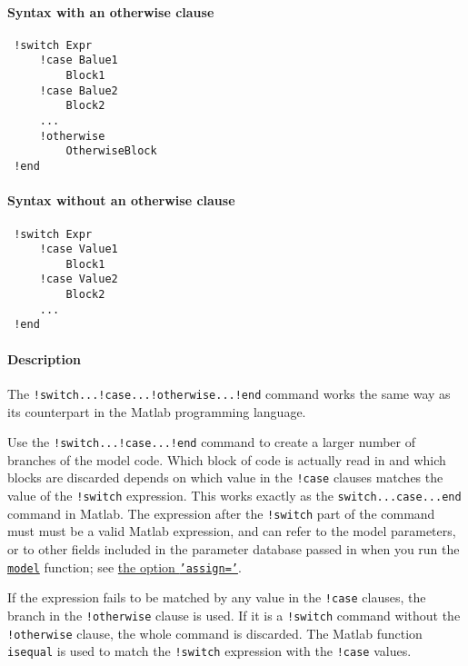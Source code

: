


	\paragraph{Syntax with an otherwise clause}
 
 \begin{verbatim}
 !switch Expr
     !case Balue1
         Block1
     !case Balue2
         Block2
     ...
     !otherwise
         OtherwiseBlock
 !end
 \end{verbatim}
 
 \paragraph{Syntax without an otherwise clause}
 
 \begin{verbatim}
 !switch Expr
     !case Value1
         Block1
     !case Value2
         Block2
     ...
 !end
 \end{verbatim}
 
 \paragraph{Description}
 
 The \texttt{!switch...!case...!otherwise...!end} command works the same
 way as its counterpart in the Matlab programming language.
 
 Use the \texttt{!switch...!case...!end} command to create a larger
 number of branches of the model code. Which block of code is actually
 read in and which blocks are discarded depends on which value in the
 \texttt{!case} clauses matches the value of the \texttt{!switch}
 expression. This works exactly as the \texttt{switch...case...end}
 command in Matlab. The expression after the \texttt{!switch} part of the
 command must must be a valid Matlab expression, and can refer to the
 model parameters, or to other fields included in the parameter database
 passed in when you run the \href{model/model}{\texttt{model}} function;
 see \href{model/model}{the option \texttt{'assign='}}.
 
 If the expression fails to be matched by any value in the \texttt{!case}
 clauses, the branch in the \texttt{!otherwise} clause is used. If it is
 a \texttt{!switch} command without the \texttt{!otherwise} clause, the
 whole command is discarded. The Matlab function \texttt{isequal} is used
 to match the \texttt{!switch} expression with the \texttt{!case} values.
 
